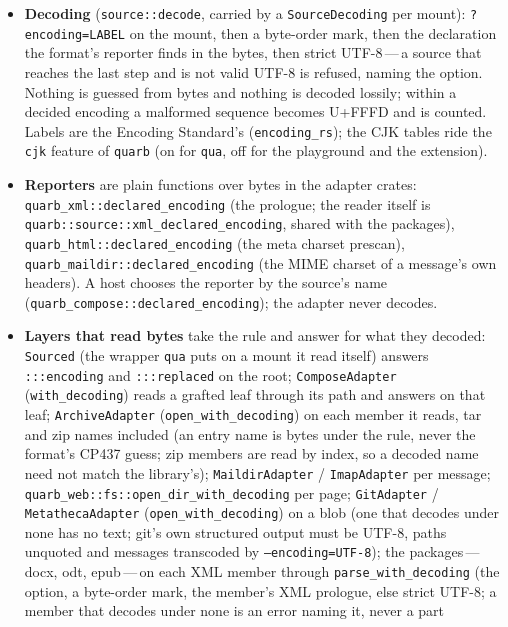 \documentclass{report}
\begin{document}
\begin{itemize}
\item \textbf{Decoding} (\texttt{source::decode}, carried by a
  \texttt{SourceDecoding} per mount): \texttt{?encoding=LABEL} on the
  mount, then a byte-order mark, then the declaration the format's
  reporter finds in the bytes, then strict UTF-8\,---\,a source that
  reaches the last step and is not valid UTF-8 is refused, naming
  the option. Nothing is guessed from bytes and nothing is decoded
  lossily; within a decided encoding a malformed sequence becomes
  U+FFFD and is counted. Labels are the Encoding Standard's
  (\texttt{encoding\_rs}); the CJK tables ride the \texttt{cjk}
  feature of \texttt{quarb} (on for \texttt{qua}, off for the
  playground and the extension).
\item \textbf{Reporters} are plain functions over bytes in the
  adapter crates: \texttt{quarb\_xml::declared\_encoding} (the
  prologue; the reader itself is
  \texttt{quarb::source::xml\_declared\_encoding}, shared with
  the packages), \texttt{quarb\_html::declared\_encoding} (the meta
  charset prescan), \texttt{quarb\_maildir::declared\_encoding} (the
  MIME charset of a message's own headers). A host chooses the
  reporter by the source's name
  (\texttt{quarb\_compose::declared\_encoding}); the adapter never
  decodes.
\item \textbf{Layers that read bytes} take the rule and answer for
  what they decoded: \texttt{Sourced} (the wrapper \texttt{qua}
  puts on a mount it read itself) answers \texttt{:::encoding} and
  \texttt{:::replaced} on the root; \texttt{ComposeAdapter}
  (\texttt{with\_decoding}) reads a grafted leaf through its path
  and answers on that leaf; \texttt{ArchiveAdapter}
  (\texttt{open\_with\_decoding}) on each member it reads, tar
  and zip names included (an entry name is bytes under the rule,
  never the format's CP437 guess; zip members are read by index, so
  a decoded name need not match the library's);
  \texttt{MaildirAdapter} / \texttt{ImapAdapter} per message;
  \texttt{quarb\_web::fs::open\_dir\_with\_decoding} per page;
  \texttt{GitAdapter} / \texttt{MetathecaAdapter}
  (\texttt{open\_with\_decoding}) on a blob (one that decodes
  under none has no text; git's own structured output must be
  UTF-8, paths unquoted and messages transcoded by
  \texttt{--encoding=UTF-8}); the packages\,---\,docx, odt,
  epub\,---\,on each XML member through
  \texttt{parse\_with\_decoding} (the option, a byte-order
  mark, the member's XML prologue, else strict UTF-8; a member
  that decodes under none is an error naming it, never a part

\end{itemize}
\end{document}
